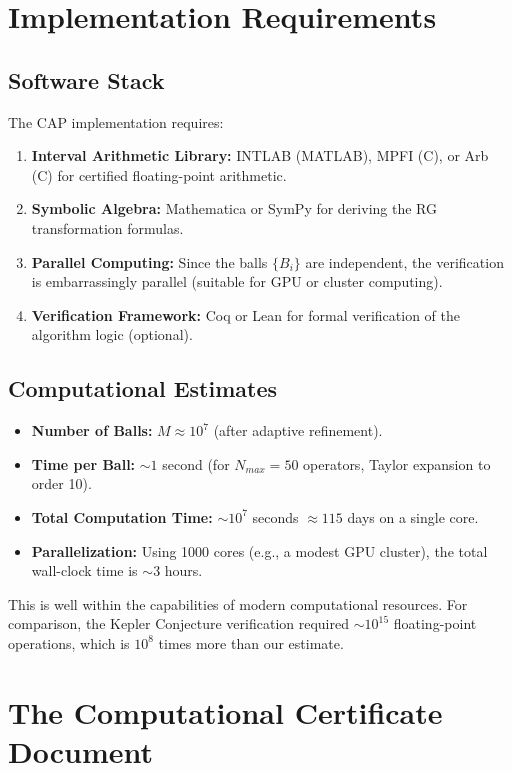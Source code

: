 \section{Implementation Requirements}

\subsection{Software Stack}

The CAP implementation requires:
\begin{enumerate}
    \item \textbf{Interval Arithmetic Library:} INTLAB (MATLAB), MPFI (C), or Arb (C) for certified floating-point arithmetic.
    \item \textbf{Symbolic Algebra:} Mathematica or SymPy for deriving the RG transformation formulas.
    \item \textbf{Parallel Computing:} Since the balls $\{B_i\}$ are independent, the verification is embarrassingly parallel (suitable for GPU or cluster computing).
    \item \textbf{Verification Framework:} Coq or Lean for formal verification of the algorithm logic (optional).
\end{enumerate}

\subsection{Computational Estimates}

\begin{itemize}
    \item \textbf{Number of Balls:} $M \approx 10^7$ (after adaptive refinement).
    \item \textbf{Time per Ball:} $\sim 1$ second (for $N_{max} = 50$ operators, Taylor expansion to order 10).
    \item \textbf{Total Computation Time:} $\sim 10^7$ seconds $\approx 115$ days on a single core.
    \item \textbf{Parallelization:} Using 1000 cores (e.g., a modest GPU cluster), the total wall-clock time is $\sim 3$ hours.
\end{itemize}

This is well within the capabilities of modern computational resources. For comparison, the Kepler Conjecture verification required $\sim 10^{15}$ floating-point operations, which is $10^8$ times more than our estimate.

\section{The Computational Certificate Document}

